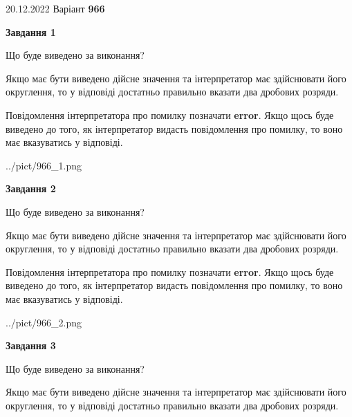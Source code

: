 \documentclass[12pt, ukrainian]{article}
\begin{document}
{20.12.2022 Варіант \No \textbf { 966 }\par}
{
\begin {Large}

{\begin {center}\textbf{Завдання 1}\end {center}}\par
Що буде виведено за виконання? \par

Якщо має бути виведено дійсне значення та інтерпретатор має здійснювати його округлення, 
то у відповіді достатньо правильно вказати два дробових розряди.

Повідомлення інтерпретатора про помилку позначати \textbf{error}.
Якщо щось буде виведено до того, як інтерпретатор видасть повідомлення про помилку, 
то воно має вказуватись у відповіді. \par

\begin{center}
	{../pict/966_1.png}
\end{center}
\newpage

{\begin {center}\textbf{Завдання 2}\end {center}}\par
Що буде виведено за виконання? \par

Якщо має бути виведено дійсне значення та інтерпретатор має здійснювати його округлення, 
то у відповіді достатньо правильно вказати два дробових розряди.

Повідомлення інтерпретатора про помилку позначати \textbf{error}.
Якщо щось буде виведено до того, як інтерпретатор видасть повідомлення про помилку, 
то воно має вказуватись у відповіді. \par

\begin{center}
	{../pict/966_2.png}
\end{center}
\newpage

{\begin {center}\textbf{Завдання 3}\end {center}}\par
Що буде виведено за виконання? \par

Якщо має бути виведено дійсне значення та інтерпретатор має здійснювати його округлення, 
то у відповіді достатньо правильно вказати два дробових розряди.


\end{Large}}
\end{document}
